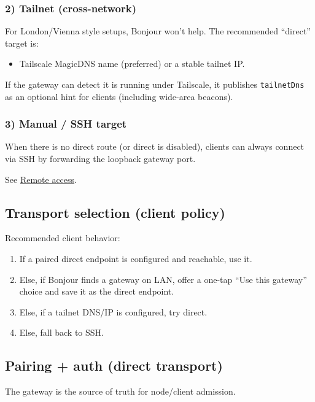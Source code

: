 \subsubsection{2) Tailnet (cross-network)}


For London/Vienna style setups, Bonjour won’t help. The recommended “direct” target is:

\begin{itemize}
  \item Tailscale MagicDNS name (preferred) or a stable tailnet IP.
\end{itemize}


If the gateway can detect it is running under Tailscale, it publishes \texttt{tailnetDns} as an optional hint for clients (including wide-area beacons).

\subsubsection{3) Manual / SSH target}


When there is no direct route (or direct is disabled), clients can always connect via SSH by forwarding the loopback gateway port.

See \href{/gateway/remote}{Remote access}.

\subsection{Transport selection (client policy)}


Recommended client behavior:

\begin{enumerate}
  \item If a paired direct endpoint is configured and reachable, use it.
  \item Else, if Bonjour finds a gateway on LAN, offer a one-tap “Use this gateway” choice and save it as the direct endpoint.
  \item Else, if a tailnet DNS/IP is configured, try direct.
  \item Else, fall back to SSH.
\end{enumerate}


\subsection{Pairing + auth (direct transport)}


The gateway is the source of truth for node/client admission.

